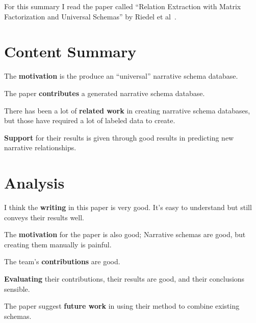 For this summary I read the paper called ``Relation Extraction with Matrix
Factorization and Universal Schemas'' by Riedel et
al~\cite{DBLP:conf/naacl/RiedelYMM13}.

\section{Content Summary}

The \textbf{motivation} is the produce an ``universal'' narrative schema
database.

The paper \textbf{contributes} a generated narrative schema database.

There has been a lot of \textbf{related work} in creating narrative schema
databases, but those have required a lot of labeled data to create.

\textbf{Support} for their results is given through good results in predicting
new narrative relationships.


\section{Analysis}

I think the \textbf{writing} in this paper is very good. It's easy to
understand but still conveys their results well.

The \textbf{motivation} for the paper is also good; Narrative schemas are good,
but creating them manually is painful.

The team's \textbf{contributions} are good.

\textbf{Evaluating} their contributions, their results are good, and their
conclusions sensible.

The paper suggest \textbf{future work} in using their method to combine
existing schemas.

